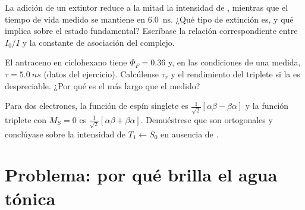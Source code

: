\begin{exercise}[$\star\star\star$]\label{exo:b3:electronic-spectroscopy:10}
La adición de un extintor reduce a la mitad la intensidad de , mientras que el tiempo de vida
medido se mantiene en \qty{6.0}{ns}. ¿Qué tipo de extinción es, y qué implica
sobre el estado fundamental? Escríbase la relación correspondiente entre $I_0/I$
y la constante de asociación del complejo.
\end{exercise}

\begin{exercise}[$\star\star\star$]\label{exo:b3:electronic-spectroscopy:11}
El antraceno en ciclohexano tiene $\Phi_F = 0.36$ y, en las condiciones de una
medida, $\tau = \qty{5.0}{ns}$ (datos del ejercicio). Calcúlense $\tau_r$ y el
rendimiento del triplete si la  es despreciable. ¿Por qué es el
 más largo que el medido?
\end{exercise}

\begin{exercise}[$\star\star\star$]\label{exo:b3:electronic-spectroscopy:12}
Para dos electrones, la función de espín singlete es $\frac{1}{\sqrt2}[\alpha\beta - \beta\alpha]$
y la función triplete con $M_S = 0$ es $\frac{1}{\sqrt2}[\alpha\beta + \beta\alpha]$. Demuéstrese que
son ortogonales y conclúyase sobre la intensidad de $T_1 \leftarrow S_0$ en
ausencia de .
\end{exercise}

\section{Problema: por qué brilla el agua tónica}

